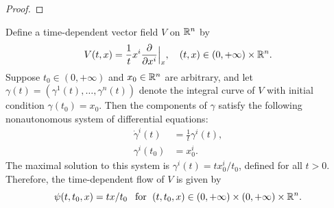 \begin{proof}
\end{proof}
\begin{example}
Define a time-dependent vector field $V$ on $\mathbb{R}^n$ by
\[V(t,x)=\frac{1}{t}x^i\frac{\partial}{\partial x^i}\Big|_x,\quad (t,x)\in(0,+\infty)\times\mathbb{R}^n.\]
Suppose $t_0\in(0,+\infty)$ and $x_0\in\mathbb{R}^n$ are arbitrary, and let $\gamma(t)=(\gamma^1(t),\dots,\gamma^n(t))$ denote the integral curve of $V$ with initial condition $\gamma(t_0)=x_0$. Then the components of $\gamma$ satisfy the following nonautonomous system of differential equations:
\begin{align*}
\dot{\gamma}^i(t)&=\frac{1}{t}\gamma^i(t),\\
\gamma^i(t_0)&=x^i_0.
\end{align*}
The maximal solution to this system is $\gamma^i(t)=tx_0^i/t_0$, defined for all $t>0$. Therefore, the time-dependent flow of $V$ is given by
\[\psi(t,t_0,x)=tx/t_0\hspace{8pt}\text{for}\hspace{6pt}(t,t_0,x)\in(0,+\infty)\times(0,+\infty)\times\mathbb{R}^n.\]
\end{example}
